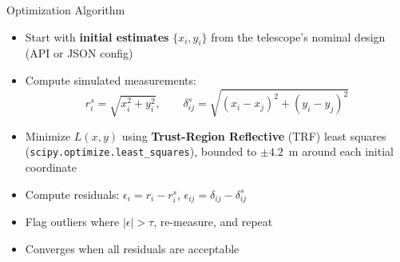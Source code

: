 \documentclass[ignorenonframetext]{beamer}
\begin{document}

\begin{frame}{Optimization Algorithm}
\begin{itemize}
  \item Start with \textbf{initial estimates} $\{x_i, y_i\}$ from the telescope's nominal design (API or JSON config)
  \item Compute simulated measurements:
  \begin{equation*}
    r_i^s = \sqrt{x_i^2 + y_i^2}, \qquad
    \delta_{ij}^s = \sqrt{(x_i - x_j)^2 + (y_i - y_j)^2}
  \end{equation*}
  \item Minimize $L(x,y)$ using \textbf{Trust-Region Reflective} (TRF) least squares (\texttt{scipy.optimize.least\_squares}), bounded to $\pm4.2$~m around each initial coordinate
  \item Compute residuals: $\epsilon_i = r_i - r_i^s$, $\epsilon_{ij} = \delta_{ij} - \delta_{ij}^s$
  \item Flag outliers where $|\epsilon| > \tau$, re-measure, and repeat
  \item Converges when all residuals are acceptable
\end{itemize}
\end{frame}

\end{document}
